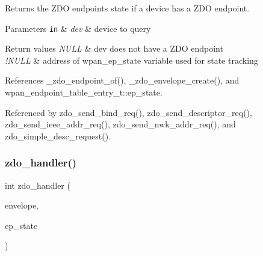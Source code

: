 Returns the Z\+DO endpoint\textquotesingle{}s state if a device has a Z\+DO endpoint. 


\begin{DoxyParams}[1]{Parameters}
\mbox{\tt in}  & {\em dev} & device to query\\
\hline
\end{DoxyParams}

\begin{DoxyRetVals}{Return values}
{\em N\+U\+LL} & {\ttfamily dev} does not have a Z\+DO endpoint \\
\hline
{\em !\+N\+U\+LL} & address of wpan\+\_\+ep\+\_\+state variable used for state tracking \\
\hline
\end{DoxyRetVals}


References \+\_\+zdo\+\_\+endpoint\+\_\+of(), \+\_\+zdo\+\_\+envelope\+\_\+create(), and wpan\+\_\+endpoint\+\_\+table\+\_\+entry\+\_\+t\+::ep\+\_\+state.



Referenced by zdo\+\_\+send\+\_\+bind\+\_\+req(), zdo\+\_\+send\+\_\+descriptor\+\_\+req(), zdo\+\_\+send\+\_\+ieee\+\_\+addr\+\_\+req(), zdo\+\_\+send\+\_\+nwk\+\_\+addr\+\_\+req(), and zdo\+\_\+simple\+\_\+desc\+\_\+request().

\mbox{\label{group__zdo_ga2e4465da8204d6c9a67edc3a6f210c1d}} 
\subsubsection{\texorpdfstring{zdo\+\_\+handler()}{zdo\_handler()}}
{\footnotesize\ttfamily int zdo\+\_\+handler (\begin{DoxyParamCaption}\item[{const \hyperlink{structwpan__envelope__t}{wpan\+\_\+envelope\+\_\+t} \hyperlink{group__hal_gaef060b3456fdcc093a7210a762d5f2ed}{F\+AR} $\ast$}]{envelope,  }\item[{\hyperlink{structwpan__ep__state__t}{wpan\+\_\+ep\+\_\+state\+\_\+t} \hyperlink{group__hal_gaef060b3456fdcc093a7210a762d5f2ed}{F\+AR} $\ast$}]{ep\+\_\+state }\end{DoxyParamCaption})}



